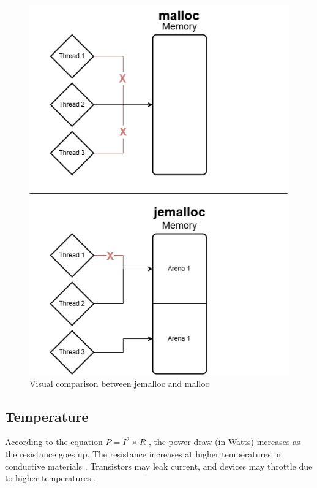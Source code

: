\documentclass[main.tex]{subfiles}
\begin{document}
\begin{figure}[h]
    \centering
    \includegraphics[width=0.8\columnwidth]{media/background/experiment-jemalloc-arenas.drawio.png}
    \caption{Visual comparison between jemalloc and malloc}
    \label{fig:malloc-vs-jemalloc}
\end{figure}

\subsection{Temperature}
According to the equation $P=I^2 \times R$ , the power draw (in Watts) increases as the resistance goes up. The resistance increases at higher temperatures in conductive materials \cite{ling2016university}. Transistors may leak current, and devices may throttle due to higher temperatures \cite{benoit2020impact}.  
\end{document}
